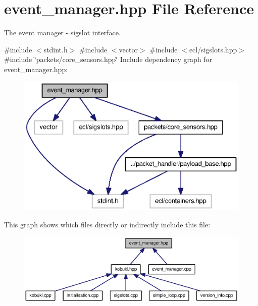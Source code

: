 \section{event\-\_\-manager.\-hpp \-File \-Reference}
\label{event__manager_8hpp}


\-The event manager -\/ sigslot interface.  


{\ttfamily \#include $<$stdint.\-h$>$}\*
{\ttfamily \#include $<$vector$>$}\*
{\ttfamily \#include $<$ecl/sigslots.\-hpp$>$}\*
{\ttfamily \#include \char`\"{}packets/core\-\_\-sensors.\-hpp\char`\"{}}\*
\-Include dependency graph for event\-\_\-manager.\-hpp\-:
\nopagebreak
\begin{figure}[H]
\begin{center}
\leavevmode
\includegraphics[width=350pt]{event__manager_8hpp__incl}
\end{center}
\end{figure}
\-This graph shows which files directly or indirectly include this file\-:
\nopagebreak
\begin{figure}[H]
\begin{center}
\leavevmode
\includegraphics[width=350pt]{event__manager_8hpp__dep__incl}
\end{center}
\end{figure}
